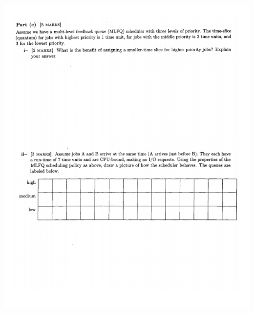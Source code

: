 \documentclass[12pt]{article}
\begin{document}
\begin{center}
    \includegraphics[width=\linewidth]{../images/midterm_5_16.png}
\end{center}
\end{document}
